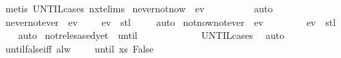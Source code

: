 \begin{isabellebody}
\ {\isacharparenleft}metis\ UNTIL{\isachardot}cases\ nxt{\isachardot}elims{\isacharparenright}%
\endisatagproof
{\isafoldproof}%
%
\isadelimproof
\isanewline
%
\endisadelimproof
\isanewline
{}\isamarkupfalse%
\ never{\isacharunderscore}not{\isacharunderscore}now{\isacharcolon}\ {\isachardoublequoteopen}{\isasymnot}\ ev\ {\isasympsi}\ {\isasymomega}\ {\isasymLongrightarrow}\ {\isasymnot}\ {\isasympsi}\ {\isasymomega}{\isachardoublequoteclose}\isanewline
%
\isadelimproof
\ \ %
\endisadelimproof
%
\isatagproof
{}\isamarkupfalse%
\ auto%
\endisatagproof
{\isafoldproof}%
%
\isadelimproof
\isanewline
%
\endisadelimproof
\isanewline
{}\isamarkupfalse%
\ never{\isacharunderscore}not{\isacharunderscore}ever{\isacharcolon}\ {\isachardoublequoteopen}{\isasymnot}\ ev\ {\isasympsi}\ {\isasymomega}\ {\isasymLongrightarrow}\ {\isasymnot}\ ev\ {\isasympsi}\ {\isacharparenleft}stl\ {\isasymomega}{\isacharparenright}{\isachardoublequoteclose}\isanewline
%
\isadelimproof
\ \ %
\endisadelimproof
%
\isatagproof
{}\isamarkupfalse%
\ auto%
\endisatagproof
{\isafoldproof}%
%
\isadelimproof
\isanewline
%
\endisadelimproof
\isanewline
{}\isamarkupfalse%
\ not{\isacharunderscore}now{\isacharunderscore}not{\isacharunderscore}ever{\isacharcolon}\ {\isachardoublequoteopen}{\isasymnot}\ ev\ {\isasympsi}\ {\isasymomega}\ {\isasymLongrightarrow}\ {\isasymnot}\ {\isasympsi}\ {\isasymomega}\ {\isasymand}\ {\isasymnot}\ ev\ {\isasympsi}\ {\isacharparenleft}stl\ {\isasymomega}{\isacharparenright}{\isachardoublequoteclose}\isanewline
%
\isadelimproof
\ \ %
\endisadelimproof
%
\isatagproof
{}\isamarkupfalse%
\ auto%
\endisatagproof
{\isafoldproof}%
%
\isadelimproof
\isanewline
%
\endisadelimproof
\isanewline
{}\isamarkupfalse%
\ not{\isacharunderscore}relesased{\isacharunderscore}yet{\isacharcolon}\ {\isachardoublequoteopen}{\isacharparenleft}{\isasymphi}\ until\ {\isasympsi}{\isacharparenright}\ {\isasymomega}\ {\isasymLongrightarrow}\ {\isasymnot}\ {\isasympsi}\ {\isasymomega}\ {\isasymLongrightarrow}\ {\isasymphi}\ {\isasymomega}{\isachardoublequoteclose}\isanewline
%
\isadelimproof
\ \ %
\endisadelimproof
%
\isatagproof
{}\isamarkupfalse%
\ UNTIL{\isachardot}cases\ \isamarkupfalse%
\ auto%
\endisatagproof
{\isafoldproof}%
%
\isadelimproof
\isanewline
%
\endisadelimproof
\isanewline
{}\isamarkupfalse%
\ until{\isacharunderscore}false{\isacharunderscore}iff{\isacharcolon}\ {\isachardoublequoteopen}alw\ {\isasymphi}\ {\isasymomega}\ {\isacharequal}\ {\isacharparenleft}{\isasymphi}\ until\ {\isacharparenleft}{\isasymlambda}xs{\isachardot}\ False{\isacharparenright}{\isacharparenright}\ {\isasymomega}{\isachardoublequoteclose}\isanewline

\end{isabellebody}
